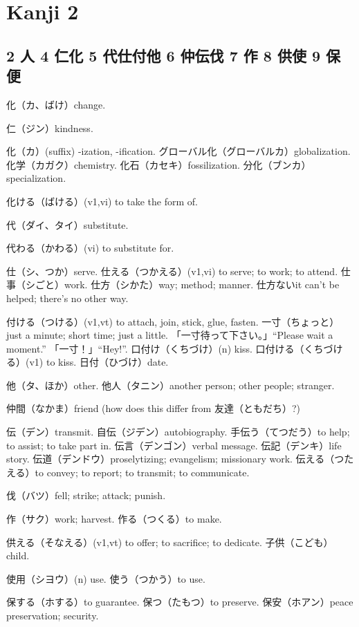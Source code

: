 \chapter{Kanji 2}

\section{2 人 4 仁化 5 代仕付他 6 仲伝伐 7 作 8 供使 9 保便}

化（カ、ばけ）change.

仁（ジン）kindness.

化（カ）(suffix) -ization, -ification.
グローバル化（グローバルカ）globalization.
化学（カガク）chemistry.
化石（カセキ）fossilization.
分化（ブンカ）specialization.

化ける（ばける）(v1,vi) to take the form of.

代（ダイ、タイ）substitute.

代わる（かわる）(vi) to substitute for.

仕（シ、つか）serve.
仕える（つかえる）(v1,vi) to serve; to work; to attend.
仕事（シごと）work.
仕方（シかた）way; method; manner.
仕方ないit can't be helped; there's no other way.

付ける（つける）(v1,vt) to attach, join, stick, glue, fasten.
一寸（ちょっと）just a minute; short time; just a little.
「一寸待って下さい。」``Please wait a moment.''
「一寸！」``Hey!''.
口付け（くちづけ）(n) kiss.
口付ける（くちづける）(v1) to kiss.
日付（ひづけ）date.

他（タ、ほか）other.
他人（タニン）another person; other people; stranger.

仲間（なかま）friend (how does this differ from 友達（ともだち）?)

伝（デン）transmit.
自伝（ジデン）autobiography.
手伝う（てつだう）to help; to assist; to take part in.
伝言（デンゴン）verbal message.
伝記（デンキ）life story.
伝道（デンドウ）proselytizing; evangelism; missionary work.
伝える（つたえる）to convey; to report; to transmit; to communicate.

伐（バツ）fell; strike; attack; punish.

作（サク）work; harvest.
作る（つくる）to make.

供える（そなえる）(v1,vt) to offer; to sacrifice; to dedicate.
子供（こども）child.

使用（シヨウ）(n) use.
使う（つかう）to use.

保する（ホする）to guarantee.
保つ（たもつ）to preserve.
保安（ホアン）peace preservation; security.

